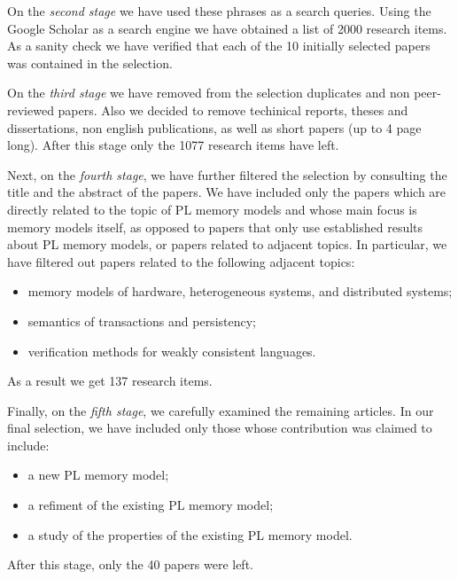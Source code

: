 On the \emph{second stage} we have used these phrases as a search queries. 
Using the Google Scholar as a search engine we have obtained a list of 2000 research items. 
As a sanity check we have verified that each of the 10 initially selected papers was contained in the selection. 

On the \emph{third stage} we have removed from the selection duplicates and non peer-reviewed papers. 
Also we decided to remove techinical reports, theses and dissertations, 
non english publications, as well as short papers (up to 4 page long).
After this stage only the 1077 research items have left.

Next, on the \emph{fourth stage}, we have further filtered the selection 
by consulting the title and the abstract of the papers. 
We have included only the papers which are directly related to the 
topic of PL memory models and whose main focus is memory models itself,
as opposed to papers that only use established results about PL memory models,
or papers related to adjacent topics. 
In particular, we have filtered out papers related to the following adjacent topics:
\begin{itemize}
  \item memory models of hardware, heterogeneous systems, and distributed systems;
  \item semantics of transactions and persistency;
  \item verification methods for weakly consistent languages.
\end{itemize}
As a result we get 137 research items.

Finally, on the \emph{fifth stage}, we carefully examined the remaining articles.
In our final selection, we have included only those whose contribution was claimed to include:
\begin{itemize}
  \item a new PL memory model;
  \item a refiment of the existing PL memory model;
  \item a study of the properties of the existing PL memory model.
\end{itemize}
After this stage, only the 40 papers were left.


  
